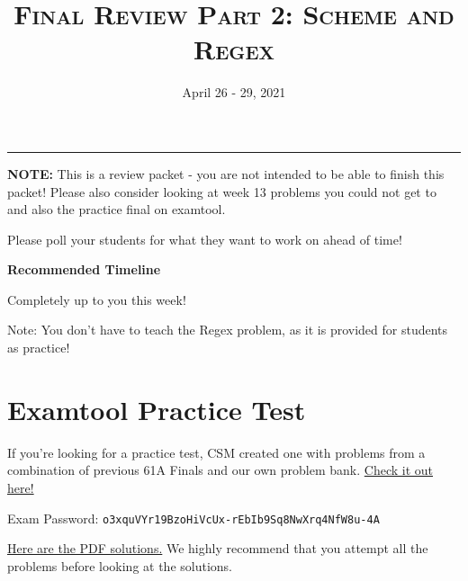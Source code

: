 \documentclass{exam}
\title{\textsc{Final Review Part 2: Scheme and Regex}}
\date{April 26 - 29, 2021}
\begin{document}
\maketitle\rule{\textwidth}{0.15em}
\fontsize{12}{15}\selectfont

\begin{blocksection}
\begin{guide}
\textbf{NOTE:} This is a review packet - you are not intended to be able to finish this packet! Please also consider looking at week 13 problems you could not get to and also the practice final on examtool.

Please poll your students for what they want to work on ahead of time!

\textbf{Recommended Timeline}

Completely up to you this week!

Note: You don't have to teach the Regex problem, as it is provided for students as practice!
\end{guide}
\end{blocksection}

\section{Examtool Practice Test}
If you're looking for a practice test, CSM created one with problems from a combination of previous 61A Finals and our own problem bank. \href{https://exam.cs61a.org/csm61a-practice-test}{Check it out here!}

Exam Password: \lstinline{o3xquVYr19BzoHiVcUx-rEbIb9Sq8NwXrq4NfW8u-4A}


\href{https://drive.google.com/file/d/1UlyBBRlOiQVR8Ban-CvUFp0kylXBvghv/view?usp=sharing}{Here are the PDF solutions.} 
We highly recommend that you attempt all the problems before looking at the solutions.

\newpage
\end{document}
